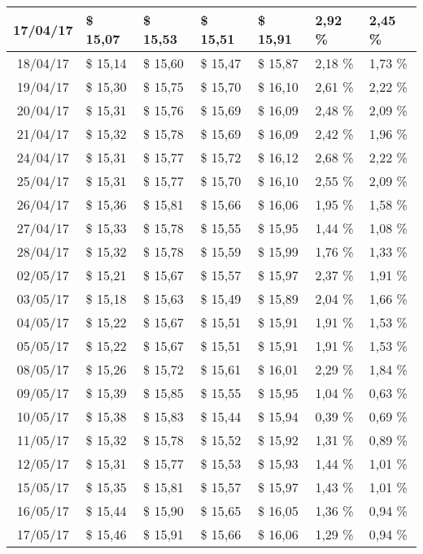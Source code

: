\begin{center}
\begin{longtable}{|c|p{1.5cm}|p{1.5cm}|p{1.5cm}|p{1.5cm}|p{1.5cm}|p{1.5cm}|}
17/04/17 & \$ 15,07 & \$ 15,53 & \$ 15,51 & \$ 15,91 & 2,92 \% & 2,45 \% \\ \hline
18/04/17 & \$ 15,14 & \$ 15,60 & \$ 15,47 & \$ 15,87 & 2,18 \% & 1,73 \% \\ \hline
19/04/17 & \$ 15,30 & \$ 15,75 & \$ 15,70 & \$ 16,10 & 2,61 \% & 2,22 \% \\ \hline
20/04/17 & \$ 15,31 & \$ 15,76 & \$ 15,69 & \$ 16,09 & 2,48 \% & 2,09 \% \\ \hline
21/04/17 & \$ 15,32 & \$ 15,78 & \$ 15,69 & \$ 16,09 & 2,42 \% & 1,96 \% \\ \hline
24/04/17 & \$ 15,31 & \$ 15,77 & \$ 15,72 & \$ 16,12 & 2,68 \% & 2,22 \% \\ \hline
25/04/17 & \$ 15,31 & \$ 15,77 & \$ 15,70 & \$ 16,10 & 2,55 \% & 2,09 \% \\ \hline
26/04/17 & \$ 15,36 & \$ 15,81 & \$ 15,66 & \$ 16,06 & 1,95 \% & 1,58 \% \\ \hline
27/04/17 & \$ 15,33 & \$ 15,78 & \$ 15,55 & \$ 15,95 & 1,44 \% & 1,08 \% \\ \hline
28/04/17 & \$ 15,32 & \$ 15,78 & \$ 15,59 & \$ 15,99 & 1,76 \% & 1,33 \% \\ \hline
02/05/17 & \$ 15,21 & \$ 15,67 & \$ 15,57 & \$ 15,97 & 2,37 \% & 1,91 \% \\ \hline
03/05/17 & \$ 15,18 & \$ 15,63 & \$ 15,49 & \$ 15,89 & 2,04 \% & 1,66 \% \\ \hline
04/05/17 & \$ 15,22 & \$ 15,67 & \$ 15,51 & \$ 15,91 & 1,91 \% & 1,53 \% \\ \hline
05/05/17 & \$ 15,22 & \$ 15,67 & \$ 15,51 & \$ 15,91 & 1,91 \% & 1,53 \% \\ \hline
08/05/17 & \$ 15,26 & \$ 15,72 & \$ 15,61 & \$ 16,01 & 2,29 \% & 1,84 \% \\ \hline
09/05/17 & \$ 15,39 & \$ 15,85 & \$ 15,55 & \$ 15,95 & 1,04 \% & 0,63 \% \\ \hline
10/05/17 & \$ 15,38 & \$ 15,83 & \$ 15,44 & \$ 15,94 & 0,39 \% & 0,69 \% \\ \hline
11/05/17 & \$ 15,32 & \$ 15,78 & \$ 15,52 & \$ 15,92 & 1,31 \% & 0,89 \% \\ \hline
12/05/17 & \$ 15,31 & \$ 15,77 & \$ 15,53 & \$ 15,93 & 1,44 \% & 1,01 \% \\ \hline
15/05/17 & \$ 15,35 & \$ 15,81 & \$ 15,57 & \$ 15,97 & 1,43 \% & 1,01 \% \\ \hline
16/05/17 & \$ 15,44 & \$ 15,90 & \$ 15,65 & \$ 16,05 & 1,36 \% & 0,94 \% \\ \hline
17/05/17 & \$ 15,46 & \$ 15,91 & \$ 15,66 & \$ 16,06 & 1,29 \% & 0,94 \% \\ \hline

\end{longtable}
\end{center}
